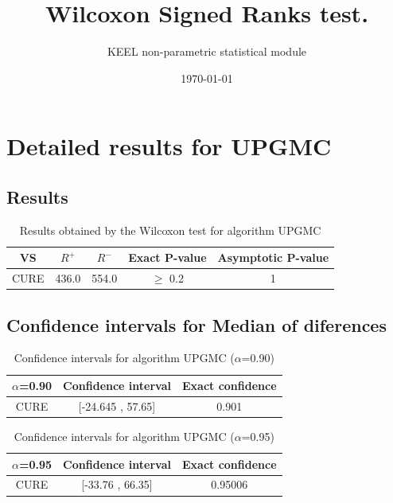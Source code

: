 \documentclass[a4paper,10pt]{article}
\title{Wilcoxon Signed Ranks test.}
\date{\today}
\author{KEEL non-parametric statistical module}
\begin{document}
\pagestyle{empty}
\maketitle
\thispagestyle{empty}



\section{Detailed results for UPGMC}


\subsection{Results}

\begin{table}[!htp]
\centering\small
\begin{tabular}{
|c|c|c|c|c|}
\hline
 VS & $R^{+}$ & $R^{-}$ & Exact P-value & Asymptotic P-value \\ \hline 
CURE & 436.0 & 554.0 & $\geq$ 0.2 & 1\\ \hline 

\end{tabular}
\caption{Results obtained by the Wilcoxon test for algorithm UPGMC}
\end{table}

\subsection{Confidence intervals for Median of diferences}

\begin{table}[!htp]
\centering\small
\begin{tabular}{
|c|c|c|}
\hline
 $\alpha$=0.90 & Confidence interval & Exact confidence \\ \hline 
CURE & [-24.645 , 57.65] & 0.901\\ \hline 

\end{tabular}
\caption{Confidence intervals for algorithm UPGMC ($\alpha$=0.90)}
\end{table}
\begin{table}[!htp]
\centering\small
\begin{tabular}{
|c|c|c|}
\hline
 $\alpha$=0.95 & Confidence interval & Exact confidence \\ \hline 
CURE & [-33.76 , 66.35] & 0.95006\\ \hline 

\end{tabular}
\caption{Confidence intervals for algorithm UPGMC ($\alpha$=0.95)}
\end{table}
\end{document}
